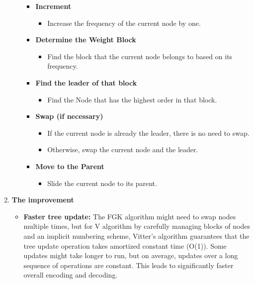 \begin{enumerate}[label=\textbf{\Alph*.}]
\begin{itemize}
        \begin{itemize}
            \item \textbf{Increment}
            \begin{itemize}
                \item Increase the frequency of the current node by one.
            \end{itemize}
            \item \textbf{Determine the Weight Block}
            \begin{itemize}
                \item Find the block that the current node belongs to based on its frequency.
            \end{itemize}
            \item \textbf{Find the leader of that block}
            \begin{itemize}
                \item Find the Node that has the highest order in that block.
            \end{itemize}
            \item \textbf{Swap (if necessary)}
            \begin{itemize}
                \item If the current node is already the leader, there is no need to swap.
                \item Otherwise, swap the current node and the leader.
            \end{itemize}
            \item \textbf{Move to the Parent}
            \begin{itemize}
                \item Slide the current node to its parent.
            \end{itemize}
        \end{itemize}
    \end{itemize}
    \item \textbf{The improvement}
    \begin{itemize}
        \item \textbf{Faster tree update:} The FGK algorithm might need to swap nodes multiple times, but for V algorithm by carefully managing blocks of nodes and an implicit numbering scheme, Vitter's algorithm guarantees that the tree update operation takes amortized constant time (O(1)). Some updates might take longer to run, but on average, updates over a long sequence of operations are constant. This leads to significantly faster overall encoding and decoding.

\end{itemize}
\end{enumerate}
